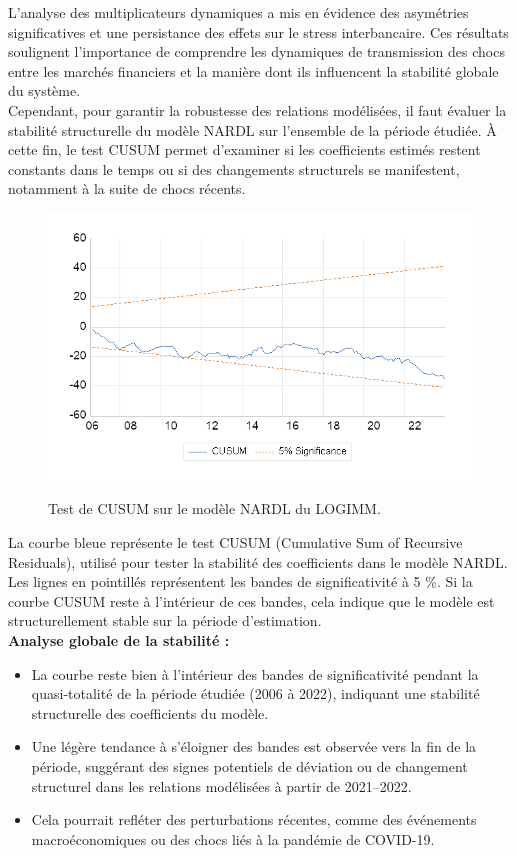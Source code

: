 L'analyse des multiplicateurs dynamiques a mis en évidence des asymétries significatives et une persistance des effets sur le stress interbancaire. Ces résultats soulignent l'importance de comprendre les dynamiques de transmission des chocs entre les marchés financiers et la manière dont ils influencent la stabilité globale du système.\\

Cependant, pour garantir la robustesse des relations modélisées, il faut évaluer la stabilité structurelle du modèle NARDL sur l’ensemble de la période étudiée. À cette fin, le test CUSUM permet d'examiner si les coefficients estimés restent constants dans le temps ou si des changements structurels se manifestent, notamment à la suite de chocs récents.

\begin{figure}[H]
    \centering
    \caption{Test de CUSUM sur le modèle NARDL du LOGIMM.}
\includegraphics{annexes/cusum_nardl_logequity.png}
    \label{fig:msih_resids}
\end{figure}

La courbe bleue représente le test CUSUM (Cumulative Sum of Recursive Residuals), utilisé pour tester la stabilité des coefficients dans le modèle NARDL. Les lignes en pointillés représentent les bandes de significativité à 5 \%. Si la courbe CUSUM reste à l'intérieur de ces bandes, cela indique que le modèle est structurellement stable sur la période d'estimation.\\

\textbf{Analyse globale de la stabilité :}
\begin{itemize}
    \item La courbe reste bien à l'intérieur des bandes de significativité pendant la quasi-totalité de la période étudiée (2006 à 2022), indiquant une stabilité structurelle des coefficients du modèle.
    \item Une légère tendance à s'éloigner des bandes est observée vers la fin de la période, suggérant des signes potentiels de déviation ou de changement structurel dans les relations modélisées à partir de 2021–2022.
    \item Cela pourrait refléter des perturbations récentes, comme des événements macroéconomiques ou des chocs liés à la pandémie de COVID-19.
\end{itemize}

